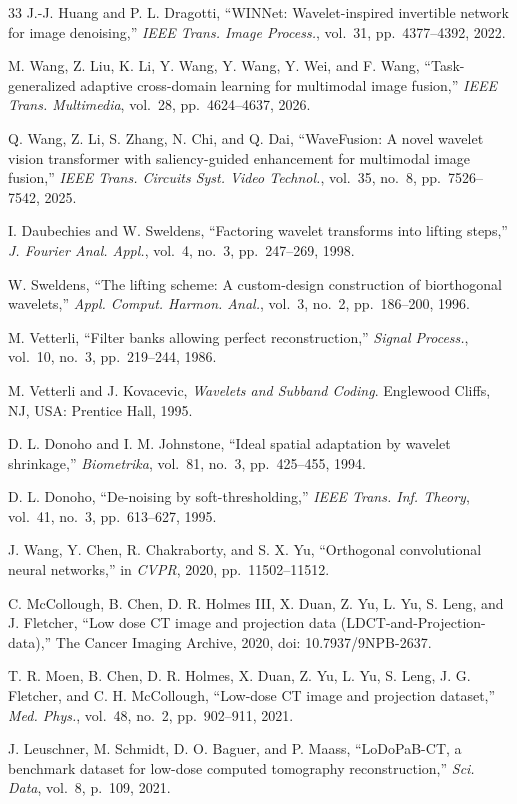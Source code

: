 \documentclass[conference]{IEEEtran}
\begin{document}
\begin{thebibliography}{33}
 J.-J. Huang and P. L. Dragotti, ``WINNet:
Wavelet-inspired invertible network for image denoising,'' \emph{IEEE Trans.
Image Process.}, vol.~31, pp.~4377--4392, 2022.

 M. Wang, Z. Liu, K. Li, Y. Wang, Y. Wang, Y. Wei,
and F. Wang, ``Task-generalized adaptive cross-domain learning for multimodal
image fusion,'' \emph{IEEE Trans. Multimedia}, vol.~28, pp.~4624--4637, 2026.

 Q. Wang, Z. Li, S. Zhang, N. Chi, and Q. Dai,
``WaveFusion: A novel wavelet vision transformer with saliency-guided
enhancement for multimodal image fusion,'' \emph{IEEE Trans. Circuits Syst.
Video Technol.}, vol.~35, no.~8, pp.~7526--7542, 2025.

 I. Daubechies and W. Sweldens, ``Factoring
wavelet transforms into lifting steps,'' \emph{J. Fourier Anal. Appl.}, vol.~4,
no.~3, pp.~247--269, 1998.

 W. Sweldens, ``The lifting scheme: A custom-design
construction of biorthogonal wavelets,'' \emph{Appl. Comput. Harmon. Anal.},
vol.~3, no.~2, pp.~186--200, 1996.

 M. Vetterli, ``Filter banks allowing perfect
reconstruction,'' \emph{Signal Process.}, vol.~10, no.~3, pp.~219--244, 1986.

 M. Vetterli and J. Kovacevic, \emph{Wavelets and
Subband Coding}. Englewood Cliffs, NJ, USA: Prentice Hall, 1995.

 D. L. Donoho and I. M. Johnstone, ``Ideal spatial
adaptation by wavelet shrinkage,'' \emph{Biometrika}, vol.~81, no.~3,
pp.~425--455, 1994.

 D. L. Donoho, ``De-noising by
soft-thresholding,'' \emph{IEEE Trans. Inf. Theory}, vol.~41, no.~3,
pp.~613--627, 1995.

 J. Wang, Y. Chen, R. Chakraborty, and S. X. Yu,
``Orthogonal convolutional neural networks,'' in \emph{CVPR}, 2020,
pp.~11502--11512.

 C. McCollough, B. Chen, D. R. Holmes III, X. Duan,
Z. Yu, L. Yu, S. Leng, and J. Fletcher, ``Low dose CT image and projection data
(LDCT-and-Projection-data),'' The Cancer Imaging Archive, 2020, doi:
10.7937/9NPB-2637.

 T. R. Moen, B. Chen, D. R. Holmes, X. Duan, Z. Yu,
L. Yu, S. Leng, J. G. Fletcher, and C. H. McCollough, ``Low-dose CT image and
projection dataset,'' \emph{Med. Phys.}, vol.~48, no.~2, pp.~902--911, 2021.

 J. Leuschner, M. Schmidt, D. O. Baguer, and
P. Maass, ``LoDoPaB-CT, a benchmark dataset for low-dose computed tomography
reconstruction,'' \emph{Sci. Data}, vol.~8, p.~109, 2021.

\end{thebibliography}
\end{document}
